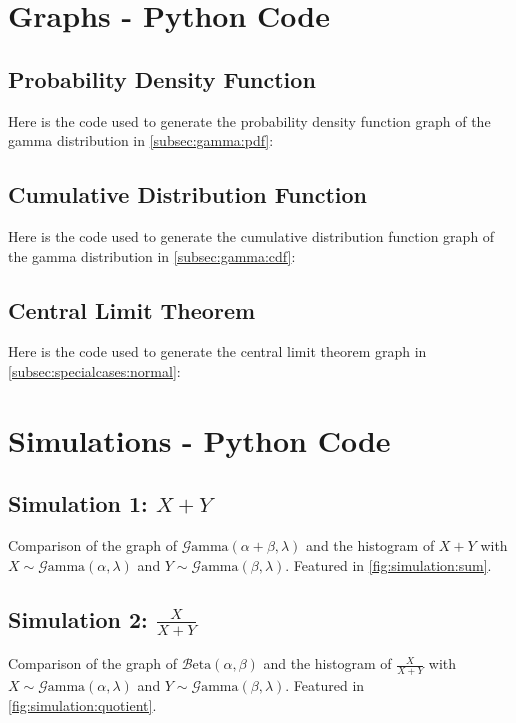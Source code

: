 \documentclass[12pt]{article}
\newcommand{\B}{\mathcal{B}}
\newcommand{\G}{\mathcal{G}}
\begin{document}
\begin{appendix}
\section{Graphs - Python Code}
\subsection{Probability Density Function}
Here is the code used to generate the probability density function graph of the gamma distribution in
\autoref{subsec:gamma:pdf}:


\pagebreak
\subsection{Cumulative Distribution Function}
Here is the code used to generate the cumulative distribution function graph of the gamma distribution in
\autoref{subsec:gamma:cdf}:


\pagebreak
\subsection{Central Limit Theorem}
Here is the code used to generate the central limit theorem graph in \autoref{subsec:specialcases:normal}:


\pagebreak
\section{Simulations - Python Code}
\subsection{Simulation 1: $X+Y$}
Comparison of the graph of $\G\text{amma}(\alpha+\beta, \lambda)$ and the histogram of $X+Y$ with
$X\sim\G\text{amma}(\alpha, \lambda)$ and $Y\sim\G\text{amma}(\beta, \lambda)$. Featured in
\autoref{fig:simulation:sum}.


\pagebreak
\subsection{Simulation 2: $\frac{X}{X+Y}$}
Comparison of the graph of $\B\text{eta}(\alpha, \beta)$ and the histogram of $\frac{X}{X+Y}$ with
$X\sim\G\text{amma}(\alpha, \lambda)$ and $Y\sim\G\text{amma}(\beta, \lambda)$. Featured in
\autoref{fig:simulation:quotient}.


\pagebreak
{}\listoffigures
\end{appendix}

\pagebreak{}\printbibliography[heading=bibintoc, title={References}]
\end{document}
